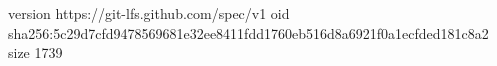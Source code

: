 version https://git-lfs.github.com/spec/v1
oid sha256:5c29d7cfd9478569681e32ee8411fdd1760eb516d8a6921f0a1ecfded181c8a2
size 1739
